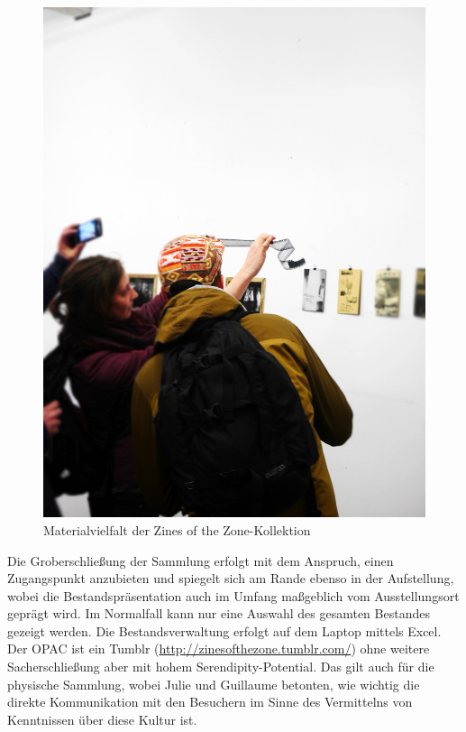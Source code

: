 \documentclass[a4paper,
fontsize=11pt,
oneside,
numbers=noperiodatend,
parskip=half-,
bibliography=totoc,
final
]{scrartcl}
\begin{document}
\begin{figure}[htbp]
\centering
\includegraphics{img/zinefilm.jpg}
\caption{Materialvielfalt der Zines of the Zone-Kollektion}
\end{figure}

Die Groberschließung der Sammlung erfolgt mit dem Anspruch, einen
Zugangspunkt anzubieten und spiegelt sich am Rande ebenso in der
Aufstellung, wobei die Bestandspräsentation auch im Umfang maßgeblich
vom Ausstellungsort geprägt wird. Im Normalfall kann nur eine Auswahl
des gesamten Bestandes gezeigt werden. Die Bestandsverwaltung erfolgt
auf dem Laptop mittels Excel. Der OPAC ist ein Tumblr
(\url{http://zinesofthezone.tumblr.com/}) ohne weitere Sacherschließung
aber mit hohem Serendipity-Potential. Das gilt auch für die physische
Sammlung, wobei Julie und Guillaume betonten, wie wichtig die direkte
Kommunikation mit den Besuchern im Sinne des Vermittelns von Kenntnissen
über diese Kultur ist.
\end{document}
